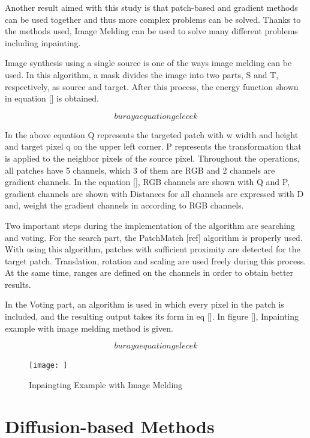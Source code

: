 Another result aimed with this study is that patch-based and gradient methods can be used together and thus more complex problems can be solved. Thanks to the methods used, Image Melding can be used to solve many different problems including inpainting.

Image synthesis using a single source is one of the ways image melding can be used. In this algorithm, a mask divides the image into two parts, S and T, respectively, as source and target. After this process, the energy function shown in equation [] is obtained.

\begin{equation}
    buraya equation gelecek
\end{equation}

In the above equation Q represents the targeted patch with w width and height and target pixel q on the upper left corner. P represents the transformation that is applied to the neighbor pixels of the source pixel. Throughout the operations, all patches have 5 channels, which 3 of them are RGB and 2 channels are gradient channels. In the equation [], RGB channels are shown with Q and P, gradient channels are shown with  Distances for all channels are expressed with D and,  weight the gradient channels in according to RGB channels.

Two important steps during the implementation of the algorithm are searching and voting. For the search part, the PatchMatch [ref] algorithm is properly used. With using this algorithm, patches with sufficient proximity are detected for the target patch. Translation, rotation and scaling are used freely during this process. At the same time, ranges are defined on the channels in order to obtain better results.

In the Voting part, an algorithm is used in which every pixel in the patch is included, and the resulting output takes its form in eq []. In figure [], Inpainting example with image melding method is given.

\begin{equation}
    buraya equation gelecek
\end{equation}

\begin{figure}[h]
    \centering
    \texttt{[image: ]}
    \caption{Inpaingting Example with Image Melding}
    \label{fig:my_label}
\end{figure}

\section{Diffusion-based Methods}

